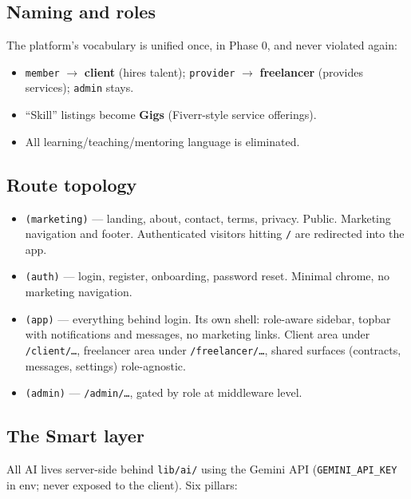 \documentclass[11pt,a4paper]{article}
\newcommand{\filepath}[1]{\texttt{#1}}
\begin{document}
\subsection{Naming and roles}
The platform's vocabulary is unified once, in Phase 0, and never violated again:

\begin{itemize}[leftmargin=1.6em]
  \item \texttt{member} $\rightarrow$ \textbf{client} (hires talent);
        \texttt{provider} $\rightarrow$ \textbf{freelancer} (provides services);
        \texttt{admin} stays.
  \item ``Skill'' listings become \textbf{Gigs} (Fiverr-style service offerings).
  \item All learning/teaching/mentoring language is eliminated.
\end{itemize}

\subsection{Route topology}
\begin{itemize}[leftmargin=1.6em]
  \item \texttt{(marketing)} --- landing, about, contact, terms, privacy. Public.
        Marketing navigation and footer. Authenticated visitors hitting \texttt{/}
        are redirected into the app.
  \item \texttt{(auth)} --- login, register, onboarding, password reset. Minimal
        chrome, no marketing navigation.
  \item \texttt{(app)} --- everything behind login. Its own shell: role-aware
        sidebar, topbar with notifications and messages, no marketing links.
        Client area under \texttt{/client/\ldots}, freelancer area under
        \texttt{/freelancer/\ldots}, shared surfaces (contracts, messages, settings)
        role-agnostic.
  \item \texttt{(admin)} --- \texttt{/admin/\ldots}, gated by role at middleware level.
\end{itemize}

\subsection{The Smart layer}
All AI lives server-side behind \filepath{lib/ai/} using the Gemini API
(\texttt{GEMINI\_API\_KEY} in env; never exposed to the client). Six pillars:
\end{document}
